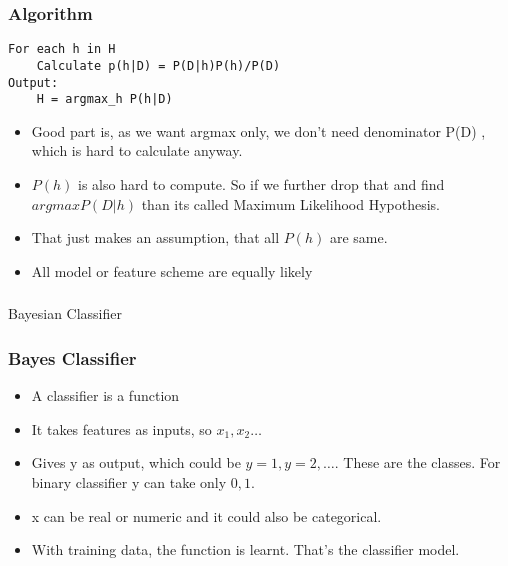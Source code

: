 \begin{frame}[fragile]\frametitle{Algorithm}

\begin{lstlisting}
For each h in H
    Calculate p(h|D) = P(D|h)P(h)/P(D)
Output:
    H = argmax_h P(h|D)

\end{lstlisting}

\begin{itemize}
\item Good part is, as we want argmax only, we don’t need denominator P(D) , which is hard to calculate anyway.
\item $P(h)$ is also hard to compute. So if we further drop that and find $argmax P(D|h)$ than its called Maximum Likelihood Hypothesis. 
\item That just makes an assumption, that all $P(h)$ are same. 
\item All model or feature scheme are equally likely
\end{itemize}

\end{frame}

\begin{frame}[fragile]\frametitle{}
\begin{center}
{\Large Bayesian Classifier}
\end{center}

\end{frame}


\begin{frame}[fragile]\frametitle{Bayes Classifier}
	\begin{itemize}
	\item A classifier is a function
	\item It takes features as inputs, so $x_1,x_2 \ldots$
	\item Gives y as output, which could be $y=1,y=2,\ldots$. These are the classes. For binary classifier y can take only $0,1$.
	\item x can be real or numeric and it could also be categorical.
	\item With training data, the function is learnt. That's the classifier model.
	\end{itemize}

\end{frame}

